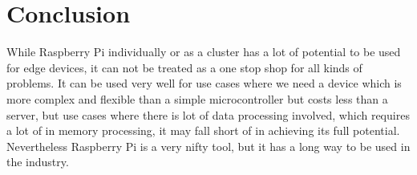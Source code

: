 \section{Conclusion}

While Raspberry Pi individually or as a cluster has a lot of potential
to be used for edge devices, it can not be treated as a one stop shop
for all kinds of problems. It can be used very well for use cases
where we need a device which is more complex and flexible than a
simple microcontroller but costs less than a server, but use cases
where there is lot of data processing involved, which requires a lot
of in memory processing, it may fall short of in achieving its full
potential. Nevertheless Raspberry Pi is a very nifty tool, but it has
a long way to be used in the industry.

 


